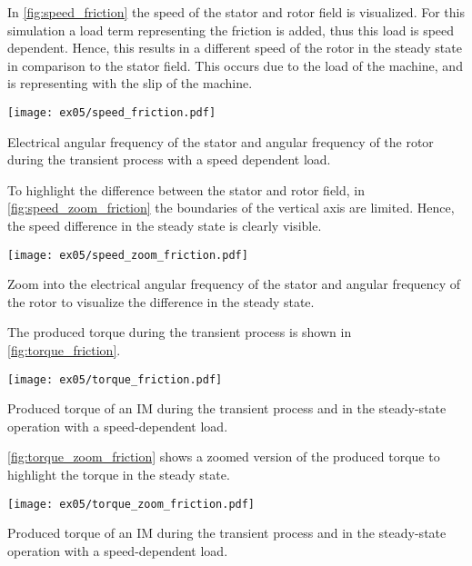 \begin{solutionblock}
    In \autoref{fig:speed_friction} the speed of the stator and rotor field is visualized. For this simulation a load term representing the friction is added, thus this load is speed dependent. Hence, this results in a different speed of the rotor in the steady state in comparison to the stator field. This occurs due to the load of the machine, and is representing with the slip of the machine.
    \begin{solutionfigure}[ht]
        \centering
        \texttt{[image: ex05/speed\_friction.pdf]}
        \caption{Electrical angular frequency of the stator and angular frequency of the rotor during the transient process with a speed dependent load.}
        \label{fig:speed_friction}
    \end{solutionfigure}
    
    To highlight the difference between the stator and rotor field, in \autoref{fig:speed_zoom_friction} the boundaries of the vertical axis are limited. Hence, the speed difference in the steady state is clearly visible.
    \begin{solutionfigure}[ht]
        \centering
        \texttt{[image: ex05/speed\_zoom\_friction.pdf]}
        \caption{Zoom into the electrical angular frequency of the stator and angular frequency of the rotor to visualize the difference in the steady state.}
        \label{fig:speed_zoom_friction}
    \end{solutionfigure}

    The produced torque during the transient process is shown in \autoref{fig:torque_friction}.
    \begin{solutionfigure}[ht]
        \centering
        \texttt{[image: ex05/torque\_friction.pdf]}
        \caption{Produced torque of an IM during the transient process and in the steady-state operation with a speed-dependent load.}
        \label{fig:torque_friction}
    \end{solutionfigure}
    \autoref{fig:torque_zoom_friction} shows a zoomed version of the produced torque to highlight the torque in the steady state.
    \begin{solutionfigure}[ht]
        \centering
        \texttt{[image: ex05/torque\_zoom\_friction.pdf]}
        \caption{Produced torque of an IM during the transient process and in the steady-state operation with a speed-dependent load.}
        \label{fig:torque_zoom_friction}
    \end{solutionfigure}


\end{solutionblock}
